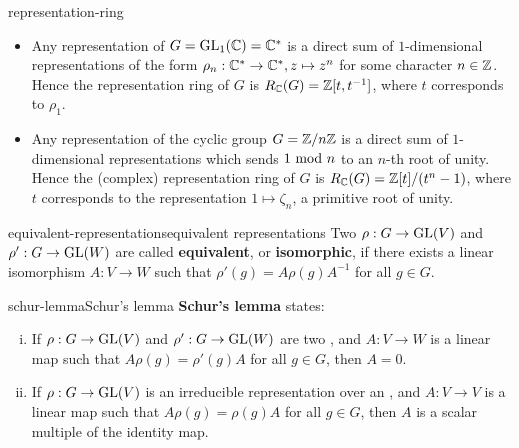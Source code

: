 \begin{example}{representation-ring}
    \begin{itemize}
        \item Any representation of $G = \textup{GL}_1(\mathbb{C}) = \mathbb{C}^*$ is a direct sum of $1$-dimensional representations of the form $\rho_n : \mathbb{C}^* \to \mathbb{C}^*, z \mapsto z^n$ for some character $n \in \mathbb{Z}$. Hence the representation ring of $G$ is $R_{\mathbb{C}}(G) = \mathbb{Z}[t, t^{-1}]$, where $t$ corresponds to $\rho_1$.
        
        \item Any representation of the cyclic group $G = \mathbb{Z}/n\mathbb{Z}$ is a direct sum of $1$-dimensional representations which sends $1 \textup{ mod } n$ to an $n$-th root of unity. Hence the (complex) representation ring of $G$ is $R_{\mathbb{C}}(G) = \mathbb{Z}[t]/(t^n - 1)$, where $t$ corresponds to the representation $1 \mapsto \zeta_n$, a primitive root of unity.
    \end{itemize}
\end{example}

\begin{topic}{equivalent-representations}{equivalent representations}
    Two  $\rho : G \to \textup{GL}(V)$ and $\rho' : G \to \textup{GL}(W)$ are called \textbf{equivalent}, or \textbf{isomorphic}, if there exists a linear isomorphism $A : V \to W$ such that $\rho'(g) = A \rho(g) A^{-1}$ for all $g \in G$.
\end{topic}

\begin{topic}{schur-lemma}{Schur's lemma}
    \textbf{Schur's lemma} states:
    \begin{enumerate}[(i)]
        \item If $\rho : G \to \textup{GL}(V)$ and $\rho' : G \to \textup{GL}(W)$ are two   , and $A : V \to W$ is a linear map such that $A \rho(g) = \rho'(g) A$ for all $g \in G$, then $A = 0$.
        \item If $\rho : G \to \textup{GL}(V)$ is an irreducible representation over an , and $A : V \to V$ is a linear map such that $A \rho(g) = \rho(g) A$ for all $g \in G$, then $A$ is a scalar multiple of the identity map.
    \end{enumerate}
\end{topic}

